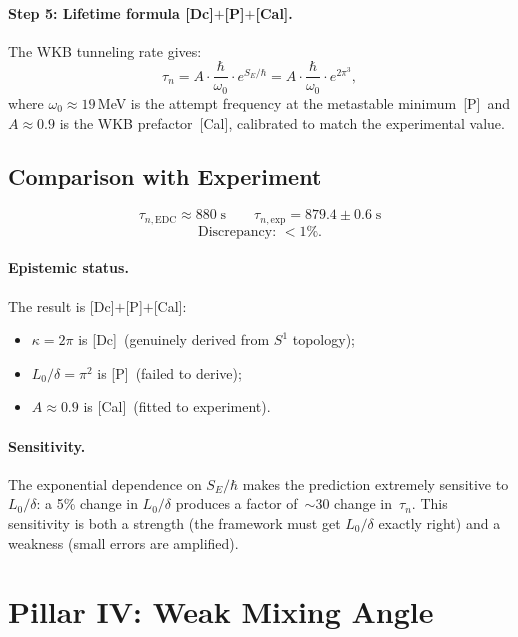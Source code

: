 \documentclass[12pt,a4paper]{article}
\theoremstyle{definition}
\theoremstyle{remark}
\newcommand{\tagDc}{\textsf{[Dc]}}
\newcommand{\tagP}{\textsf{[P]}}
\newcommand{\tagCal}{\textsf{[Cal]}}
\begin{document}
\paragraph{Step 5: Lifetime formula \tagDc$+$\tagP$+$\tagCal.}
The WKB tunneling rate gives:
\begin{equation}
  \tau_n = A \cdot \frac{\hbar}{\omega_0} \cdot e^{S_E/\hbar}
         = A \cdot \frac{\hbar}{\omega_0} \cdot e^{2\pi^3},
  \label{eq:tau_n}
\end{equation}
where $\omega_0 \approx 19$\,MeV is the attempt frequency at the
metastable minimum~\tagP\ and $A \approx 0.9$ is the WKB
prefactor~\tagCal, calibrated to match the experimental value.

\subsection{Comparison with Experiment}

\begin{equation}
  \tau_{n,\mathrm{EDC}} \approx 880\;\mathrm{s}
  \qquad
  \tau_{n,\mathrm{exp}} = 879.4 \pm 0.6\;\mathrm{s}
\end{equation}
\[
  \text{Discrepancy: } < 1\%.
\]

\paragraph{Epistemic status.}
The result is \tagDc$+$\tagP$+$\tagCal:
\begin{itemize}[nosep]
\item $\kappa = 2\pi$ is \tagDc\ (genuinely derived from $S^1$
  topology);
\item $L_0/\delta = \pi^2$ is \tagP\ (failed to derive);
\item $A \approx 0.9$ is \tagCal\ (fitted to experiment).
\end{itemize}

\paragraph{Sensitivity.}
The exponential dependence on $S_E/\hbar$ makes the prediction
extremely sensitive to $L_0/\delta$:
a 5\% change in $L_0/\delta$ produces a factor of~$\sim 30$ change
in~$\tau_n$.  This sensitivity is both a strength (the framework
must get $L_0/\delta$ exactly right) and a weakness (small errors
are amplified).

\section{Pillar IV: Weak Mixing Angle}
\label{sec:weinberg}
\end{document}
